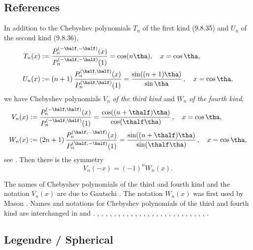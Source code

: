 \documentclass[envcountchap,graybox]{svmono}
\begin{document}
\subsection*{References}
\label{sec9.8.2}
In addition to the Chebyshev polynomials $T_n$ of the first kind (9.8.35)
and $U_n$ of the second kind (9.8.36),
\begin{align}
T_n(x)&:=\frac{P_n^{(-\half,-\half)}(x)}{P_n^{(-\half,-\half)}(1)}
=\cos(n\tha),\quad x=\cos\tha,\\
U_n(x)&:=(n+1)\,\frac{P_n^{(\half,\half)}(x)}{P_n^{(\half,\half)}(1)}
=\frac{\sin((n+1)\tha)}{\sin\tha}\,,\quad x=\cos\tha,
\end{align}
we have Chebyshev polynomials $V_n$ {\em of the third kind}
and $W_n$ {\em of the fourth kind},
\begin{align}
V_n(x)&:=\frac{P_n^{(-\half,\half)}(x)}{P_n^{(-\half,\half)}(1)}
=\frac{\cos((n+\thalf)\tha)}{\cos(\thalf\tha)}\,,\quad x=\cos\tha,\\
W_n(x)&:=(2n+1)\,\frac{P_n^{(\half,-\half)}(x)}{P_n^{(\half,-\half)}(1)}
=\frac{\sin((n+\thalf)\tha)}{\sin(\thalf\tha)}\,,\quad x=\cos\tha,
\end{align}
see \cite[Section 1.2.3]{K20}. Then there is the symmetry
\begin{equation}
V_n(-x)=(-1)^n W_n(x).
\label{140}
\end{equation}

The names of Chebyshev polynomials of the third and fourth kind
and the notation $V_n(x)$ are due to Gautschi \cite{K21}.
The notation $W_n(x)$ was first used by Mason \cite{K22}.
Names and notations for Chebyshev polynomials of the third and fourth
kind are interchanged in  and
.
%
\cite{Abram}, \cite{AskeyFitch}, \cite{AskeyGasperHarris}, \cite{AskeyIsmail76},
\cite{Bavinck95}, \cite{Chihara78}, \cite{Danese}, \cite{DilcherStolarsky},
\cite{Erdelyi+}, \cite{Grad}, \cite{HartmannStephan}, \cite{Ismail2005II}, \cite{Koekoek2000},
\cite{Luke}, \cite{Mathai}, \cite{Nikiforov+}, \cite{NikiforovUvarov}, \cite{Rainville},
\cite{Rayes+}, \cite{Rivlin}, \cite{SainteViennot}, \cite{Szego75}, \cite{Temme},
\cite{Wilson70I}, \cite{Zayed}, \cite{Zhang}, \cite{ZhangWang}.

\subsection{Legendre / Spherical}
\end{document}
